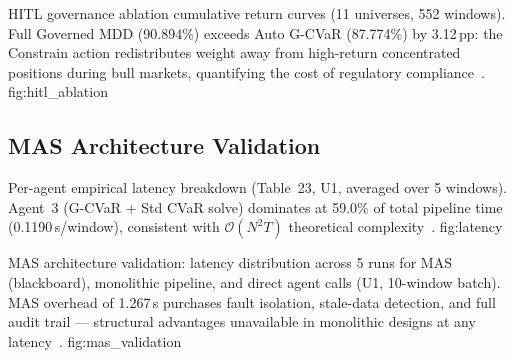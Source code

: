   {HITL governance ablation cumulative return curves (11 universes,
   552 windows). Full Governed MDD (90.894\%) exceeds Auto G-CVaR
   (87.774\%) by 3.12\,pp: the Constrain action redistributes
   weight away from high-return concentrated positions during bull
   markets, quantifying the cost of regulatory compliance~\citep{nystrup2019}.}
  {fig:hitl_ablation}

\subsection{MAS Architecture Validation}

\begin{table}[htbp]
\centering
\caption{MAS vs monolithic architecture (Table~28, U1, 10 windows,
         5 runs). The 1.267-second overhead per 10-window batch
         purchases complete audit trail and fault isolation~\citep{hayesroth1985,wooldridge2009}.}
\label{tab:mas}
\end{table}

  {Per-agent empirical latency breakdown (Table~23, U1, averaged
   over 5 windows). Agent~3 (G-CVaR + Std CVaR solve) dominates
   at 59.0\% of total pipeline time (0.1190\,s/window), consistent
   with $\mathcal{O}(N^2 T)$ theoretical complexity~\citep{rockafellar2000,diamond2016}.}
  {fig:latency}

  {MAS architecture validation: latency distribution across 5 runs
   for MAS (blackboard), monolithic pipeline, and direct agent calls
   (U1, 10-window batch). MAS overhead of 1.267\,s purchases fault
   isolation, stale-data detection, and full audit trail — structural
   advantages unavailable in monolithic designs at any
   latency~\citep{hayesroth1985,erman1980,mifid2014}.}
  {fig:mas_validation}

